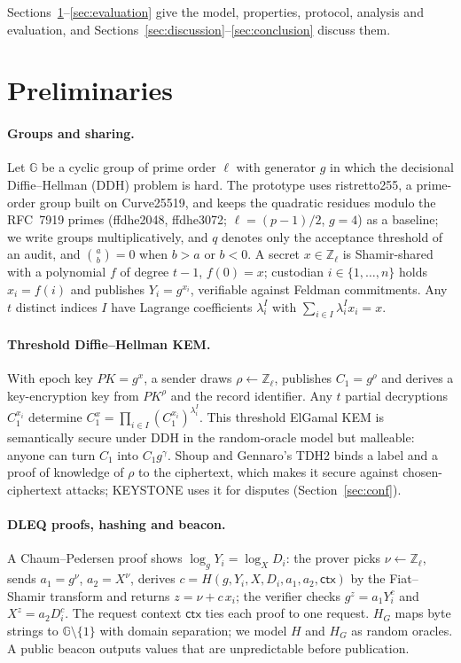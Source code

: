 \documentclass[Crown,sagev]{sagej}
\theoremstyle{plain}
\theoremstyle{definition}
\theoremstyle{remark}
\newcommand{\G}{\mathbb{G}}
\newcommand{\Zq}{\mathbb{Z}_\ell}
\begin{document}
Sections~\ref{sec:prelim}--\ref{sec:evaluation} give the model, properties, protocol, analysis and evaluation, and Sections~\ref{sec:discussion}--\ref{sec:conclusion} discuss them.

\section{Preliminaries}\label{sec:prelim}

\paragraph{Groups and sharing.} Let $\G$ be a cyclic group of prime order $\ell$ with generator $g$ in which the decisional Diffie--Hellman (DDH) problem is hard. The prototype uses ristretto255, a prime-order group built on Curve25519\cite{rfc9496}, and keeps the quadratic residues modulo the RFC~7919 primes\cite{rfc7919} (ffdhe2048, ffdhe3072; $\ell=(p-1)/2$, $g=4$) as a baseline; we write groups multiplicatively, and $q$ denotes only the acceptance threshold of an audit, and $\binom{a}{b}=0$ when $b>a$ or $b<0$. A secret $x\in\Zq$ is Shamir-shared with a polynomial $f$ of degree $t-1$, $f(0)=x$; custodian $i\in\{1,\dots,n\}$ holds $x_i=f(i)$ and publishes $Y_i=g^{x_i}$\cite{shamir1979share}, verifiable against Feldman commitments\cite{feldman1987vss}. Any $t$ distinct indices $I$ have Lagrange coefficients $\lambda_i^I$ with $\sum_{i\in I}\lambda_i^I x_i=x$.

\paragraph{Threshold Diffie--Hellman KEM.} With epoch key $PK=g^{x}$, a sender draws $\rho\leftarrow\Zq$, publishes $C_1=g^{\rho}$ and derives a key-encryption key from $PK^{\rho}$ and the record identifier. Any $t$ partial decryptions $C_1^{x_i}$ determine $C_1^{x}=\prod_{i\in I}(C_1^{x_i})^{\lambda_i^I}$. This threshold ElGamal KEM\cite{desmedt1990threshold} is semantically secure under DDH in the random-oracle model but malleable: anyone can turn $C_1$ into $C_1g^{\gamma}$. Shoup and Gennaro's TDH2 binds a label and a proof of knowledge of $\rho$ to the ciphertext, which makes it secure against chosen-ciphertext attacks\cite{shoup2002securing}; KEYSTONE uses it for disputes (Section~\ref{sec:conf}).

\paragraph{DLEQ proofs, hashing and beacon.} A Chaum--Pedersen proof\cite{chaum1992dleq} shows $\log_g Y_i=\log_X D_i$: the prover picks $\nu\leftarrow\Zq$, sends $a_1=g^{\nu}$, $a_2=X^{\nu}$, derives $c=H(g,Y_i,X,D_i,a_1,a_2,\mathsf{ctx})$ by the Fiat--Shamir transform\cite{fiat1987prove} and returns $z=\nu+c\,x_i$; the verifier checks $g^{z}=a_1Y_i^{c}$ and $X^{z}=a_2D_i^{c}$. The request context $\mathsf{ctx}$ ties each proof to one request. $H_G$ maps byte strings to $\G\setminus\{1\}$ with domain separation; we model $H$ and $H_G$ as random oracles. A public beacon outputs values that are unpredictable before publication\cite{das2022spurt}.
\end{document}
